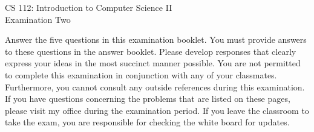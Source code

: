 \documentclass[12pt]{article}
\def\widow#1{\vskip #1\vbadness10000\penalty-200\vskip-#1}
\begin{document}
\def\widow#1{\vskip #1\vbadness10000\penalty-200\vskip-#1}

\begin{center}

  CS 112: Introduction to Computer Science II \\
  Examination Two \\

\end{center}

\noindent Answer the five questions in this examination booklet.  You must provide answers to these questions in the
answer booklet. Please develop responses that clearly express your ideas in the most succinct manner possible.  You are
not permitted to complete this examination in conjunction with any of your classmates.  Furthermore, you cannot consult
any outside references during this examination.  If you have questions concerning the problems that are listed on these
pages, please visit my office during the examination period.  If you leave the classroom to take the exam, you are
responsible for checking the white board for updates.
\end{document}
